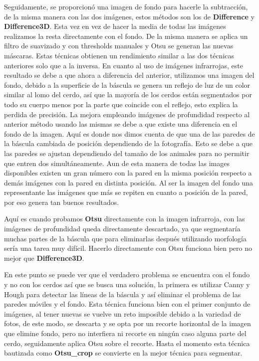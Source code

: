 \documentclass[12pt,a4paper]{article}
\begin{document}
Seguidamente, se proporcionó una imagen de fondo para hacerle la subtracción, de la misma manera con las dos imágenes, estos métodos son los de \textbf{Difference} y \textbf{Difference3D}. Esta vez en vez de hacer la media de todas las imágenes realizamos la resta directamente con el fondo. De la misma manera se aplica un filtro de suavizado y con thresholds manuales y Otsu se generan las nuevas máscaras. Estas técnicas obtienen un rendimiento similar a las dos técnicas anteriores solo que a la inversa. En cuanto al uso de imágenes infrarrojas, este resultado se debe a que ahora a diferencia del anterior, utilizamos una imagen del fondo, debido a la superficie de la báscula se genera un reflejo de luz de un color similar al lomo del cerdo, así que la mayoría de los cerdos están segmentados por todo su cuerpo menos por la parte que coincide con el reflejo, esto explica la perdida de precisión. La mejora empleando imágenes de profundidad respecto al anterior método usando las mismas se debe a que existe una diferencia en el fondo de la imagen. Aquí es donde nos dimos cuenta de que una de las paredes de la báscula cambiada de posición dependiendo de la fotografía. Esto se debe a que las paredes se ajustan dependiendo del tamaño de los animales para no permitir que entren dos simultáneamente. Aun de esta manera de todas las images disponibles existen un gran número con la pared en la misma posición respecto a demás imágenes con la pared en distinta posición. Al ser la imagen del fondo una representante las imágenes que más se repiten en cuanto a posición de la pared, por eso genera tan buenos resultados.

Aquí es cuando probamos \textbf{Otsu} directamente con la imagen infrarroja, con las imágenes de profundidad queda directamente descartado, ya que segmentaría muchas partes de la báscula que para eliminarlas después utilizando morfología sería una tarea muy difícil. Hacerlo directamente con Otsu funciona bien pero no mejor que \textbf{Difference3D}.

En este punto se puede ver que el verdadero problema se encuentra con el fondo y no con los cerdos así que se busca una solución, la primera es utilizar Canny y Hough\cite{hough} para detectar las líneas de la báscula y así eliminar el problema de las paredes móviles y el fondo. Esta técnica funciona bien con el primer conjunto de imágenes, al tener nuevas se vuelve un reto imposible debido a la variedad de fotos, de este modo, se descarta y se opta por un recorte horizontal de la imagen que elimine fondo, pero no interfiera ni recorte en ningún caso alguna parte del cerdo, seguidamente aplica Otsu sobre el recorte. Hasta el momento esta técnica bautizada como \textbf{Otsu\_crop} se convierte en la mejor técnica para segmentar.
\end{document}
